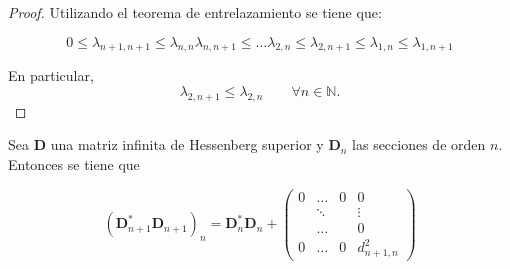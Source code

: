 \begin{proof} Utilizando el teorema de entrelazamiento se tiene que:

	$$
		0 \leq \lambda_{n+1,n+1} \leq \lambda_{n,n} \lambda_{n,n+1} \leq \dots \lambda_{2,n}  \leq \lambda_{2,n+1} \leq \lambda_{1,n} \leq \lambda_{1,n+1}
	$$

	\noindent En particular,
	$$
		\lambda_{2,n+1} \leq \lambda_{2,n} \qquad \forall n\in \mathbb{N}.
	$$
\end{proof}

\noindent

\begin{lemma} Sea $\mathbf{D}$ una matriz infinita de Hessenberg superior y $\mathbf{D}_n$ las secciones de orden $n$. Entonces se tiene que

	$$
		(\mathbf{D}_{n+1}^{*}\mathbf{D}_{n+1})_{n} = \mathbf{D}_n^{*}\mathbf{D}_n +\begin{pmatrix}
			0 & \dots  & 0 & 0           \\
			  & \ddots &   & \vdots      \\
			  & \dots  &   & 0           \\
			0 & \dots  & 0 & d_{n+1,n}^2
		\end{pmatrix}
	$$
\end{lemma}

